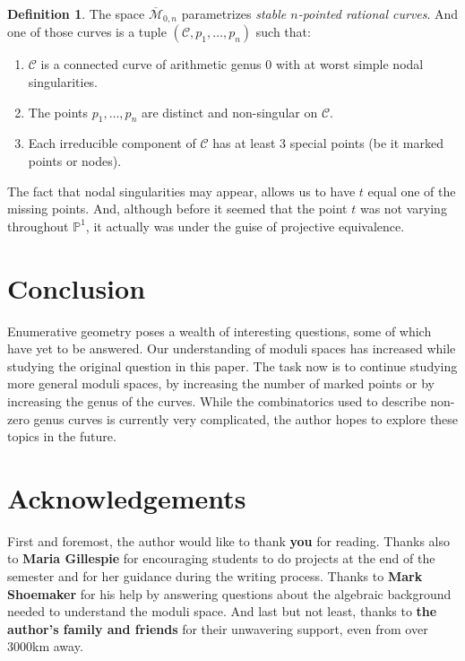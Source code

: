 \documentclass[11pt]{article}
\newcommand{\bP}{\mathbb{P}}
\newcommand{\ov}{\overline}        %
\newcommand{\cM}{\mathcal{M}}           %
\newcommand{\cC}{\mathcal{C}}           %
\theoremstyle{definition}
\newtheorem{Def}{Definition}           %
\theoremstyle{remark}
\numberwithin{theorem}{section}
\begin{document}
\begin{Def}
    The space $\ov{\cM}_{0,n}$ parametrizes \emph{stable $n$-pointed rational curves}. And one of those curves is a tuple $(\cC,p_1,\dots,p_n)$ such that:
    \begin{enumerate}
        \itemsep=-0.4em
        \item $\cC$ is a connected curve of arithmetic genus 0 with at worst simple nodal singularities.
        \item The points $p_1,\dots,p_n$ are distinct and non-singular on $\cC$.
        \item Each irreducible component of $\cC$ has at least $3$ special points (be it marked points or nodes).
    \end{enumerate}
\end{Def}

The fact that nodal singularities may appear, allows us to have $t$ equal one of the missing points. And, although before it seemed that the point $t$ was not varying throughout $\bP^1$, it actually was under the guise of projective equivalence.

\section{Conclusion}

Enumerative geometry poses a wealth of interesting questions, some of which have yet to be answered. Our understanding of moduli spaces has increased while studying the original question in this paper. The task now is to continue studying more general moduli spaces, by increasing the number of marked points or by increasing the genus of the curves. While the combinatorics used to describe non-zero genus curves is currently very complicated, the author hopes to explore these topics in the future.

\section{Acknowledgements}

First and foremost, the author would like to thank \textbf{you} for reading. Thanks also to \textbf{Maria Gillespie} for encouraging students to do projects at the end of the semester and for her guidance during the writing process. Thanks to \textbf{Mark Shoemaker} for his help by answering questions about the algebraic background needed to understand the moduli space. And last but not least, thanks to \textbf{the author's family and friends} for their unwavering support, even from over 3000km away. 

\nocite{*}


\end{document}
